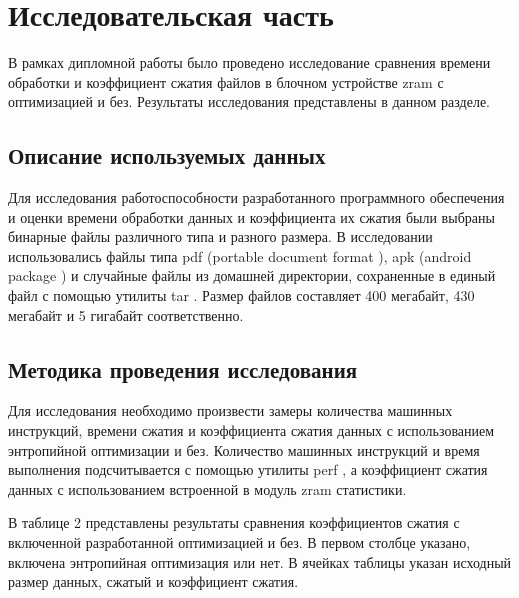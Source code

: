 \section{Исследовательская часть}

В рамках дипломной работы было проведено исследование сравнения времени обработки и коэффициент сжатия файлов в блочном устройстве zram с оптимизацией и без. Результаты исследования представлены в данном разделе.

\subsection{Описание используемых данных}

Для исследования работоспособности разработанного программного обеспечения и оценки времени обработки данных и коэффициента их сжатия были выбраны бинарные файлы различного типа и разного размера. В исследовании использовались файлы типа pdf (portable document format \cite{pdf}), apk (android package \cite{apk}) и случайные файлы из домашней директории, сохраненные в единый файл с помощью утилиты tar \cite{tar}. Размер файлов составляет 400 мегабайт, 430 мегабайт и 5 гигабайт соответственно.

\subsection{Методика проведения исследования}

Для исследования необходимо произвести замеры количества машинных инструкций, времени сжатия и коэффициента сжатия данных с использованием энтропийной оптимизации и без. Количество машинных инструкций и время выполнения подсчитывается с помощью утилиты perf \cite{perf}, а коэффициент сжатия данных с использованием встроенной в модуль zram статистики.

В таблице 2 представлены результаты сравнения коэффициентов сжатия с включенной разработанной оптимизацией и без. В первом столбце указано, включена энтропийная оптимизация или нет. В ячейках таблицы указан исходный размер данных, сжатый и коэффициент сжатия.


